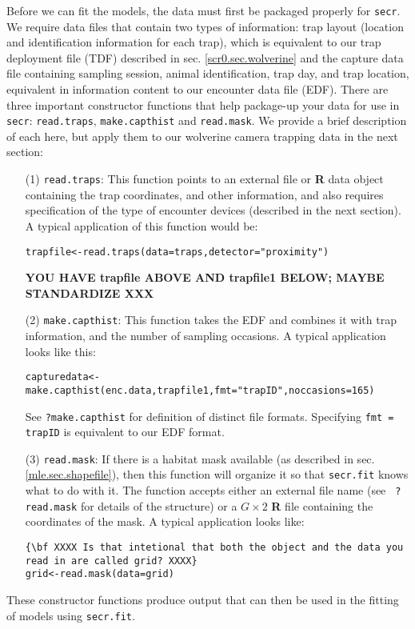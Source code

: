 Before we can fit the models, the data must first be packaged properly
for 
\mbox{\tt secr}.  
We require data files that contain two types of information:
trap layout (location and
identification information for each trap), which is equivalent to our
trap deployment file (TDF) described in sec. \ref{scr0.sec.wolverine}
and the capture data file containing 
sampling session, animal identification, trap day, and trap
location,  equivalent in information content to our encounter data file (EDF).
There are three important constructor functions that help package-up
your 
data for use in \mbox{\tt secr}:
\mbox{\tt read.traps},
\mbox{\tt make.capthist} and
\mbox{\tt read.mask}. 
We provide a brief description of each here, but apply them to our
wolverine camera trapping data in the next section:
\begin{itemize}
\item[(1)] 
\mbox{\tt read.traps}: This function points to an external file or
{\bf R} data object containing the trap coordinates, and other
information, and also requires specification of the type of encounter
devices (described in the next section). A typical application of this
function would be:
\begin{verbatim}
trapfile<-read.traps(data=traps,detector="proximity")
\end{verbatim}
{\bf YOU HAVE trapfile ABOVE AND trapfile1 BELOW; MAYBE STANDARDIZE XXX}
\item[(2)] \mbox{\tt make.capthist}: This function takes the EDF and combines it
with trap information, and the number of sampling occasions. A typical
application looks like this:
\begin{verbatim}
capturedata<-make.capthist(enc.data,trapfile1,fmt="trapID",noccasions=165)
\end{verbatim}
See \mbox{\tt ?make.capthist} for definition of distinct file
formats. Specifying  \mbox{\tt fmt = trapID}  is equivalent to our EDF format.
\item[(3)] \mbox{\tt read.mask}: If there is a habitat mask
  available 
(as described in sec. \ref{mle.sec.shapefile}), then this function
will organize it so that \mbox{\tt secr.fit} knows what to do with it.
The function accepts either an external file name (see \mbox{\tt
  ?read.mask} for details of the structure) or a $G\times 2$ {\bf R} file
containing the coordinates of the mask. A typical application looks
like:
\begin{verbatim}
{\bf XXXX Is that intetional that both the object and the data you read in are called grid? XXXX}
grid<-read.mask(data=grid)
\end{verbatim}
\end{itemize}
These constructor functions produce output that can then be used in
the fitting of models using \mbox{\tt secr.fit}.

